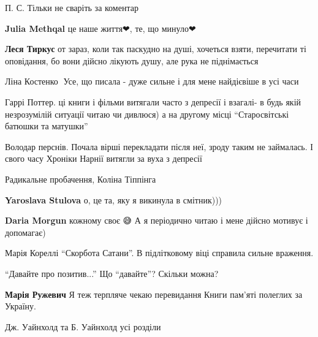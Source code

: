 П. С. Тільки не сваріть за коментар

\begin{itemize} %
\textbf{Julia Methqal} це наше життя❤, те, що минуло❤

\textbf{Леся Тиркус} от зараз, коли так паскудно на душі, хочеться взяти, перечитати ті оповідання, бо вони дійсно лікують душу, але рука не піднімається
\end{itemize} %



Ліна Костенко💛 Усе, що писала - дуже сильне і для мене найдієвіше в усі часи


Гаррі Поттер. ці книги і фільми витягали часто з депресії і взагалі- в будь якій
незрозумілій ситуації читаю чи дивлюся) а на другому місці \enquote{Старосвітські
батюшки та матушки}


Володар перснів. Почала вірші перекладати після неї, зроду таким не займалась.
І свого часу Хроніки Нарнії витягли за вуха з депресії


Радикальне пробачення, Коліна Тіппінга 🤔

\begin{itemize} %
\textbf{Yaroslava Stulova} о, це та, яку я викинула в смітник)))

\textbf{Daria Morgun} кожному своє 😅 А я періодично читаю і мене дійсно мотивує і допомагає)
\end{itemize} %


Марія Кореллі \enquote{Скорбота Сатани}. В підлітковому віці справила сильне враження.


\enquote{Давайте про позитив...} Що \enquote{давайте}? Скільки можна?

\begin{itemize} %
\textbf{Марія Ружевич} Я теж терпляче чекаю перевидання Книги пам'яті полеглих за Україну.
\end{itemize} %


Дж. Уайнхолд та Б. Уайнхолд усі розділи


